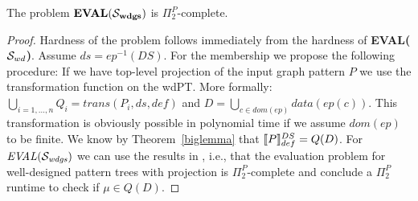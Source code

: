 \begin{corollary}
The problem	$\mathit{\mathbf{EVAL(\mathcal{S}_{wdgs})}}$ is $\Pi^P_2$-complete.
\end{corollary}
\begin{proof}
Hardness of the problem follows immediately from the hardness of 
\textbf{EVAL($\mathcal{S}_{wd}$)}.
Assume $ds = ep^{-1}(DS)$. %
For the membership we propose the following procedure:
If we have top-level projection of the input graph pattern $P$ we  use the
transformation function on the wdPT. More formally:
$\bigcup\limits_{i=1,\dots,n}Q_i = trans(P_i,ds,def)$ and $D = \bigcup\limits_{c\in dom(ep)} data(ep(c))$. This transformation is obviously
possible in polynomial time if we assume $dom(ep)$ to be finite. We know by Theorem~\ref{biglemma} that 
$\llbracket P \rrbracket^{DS}_{def} = Q(D)$.
For $\mathbf{\mathit{EVAL(\mathcal{S}_{wdgs})}}$ we can use the results in 
\cite{letelier2013static}, i.e., that the evaluation problem for well-designed
pattern trees with projection is $\Pi^P_2$-complete and conclude a $\Pi^P_2$ runtime to
check if $\mu \in Q(D)$. 
\end{proof}

